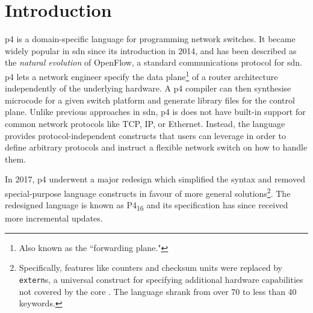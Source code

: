 \chapter*{Introduction}
\setcounter{page}{1}

\newcommand{\pfs}{\texorpdfstring{{P}4\textsubscript{16}}{P4 16} }

\begin{chapterabstract}
\end{chapterabstract}

\acrfull{p4} is a domain-specific language for programming network switches. It
became widely popular in \acrfull{sdn} since its introduction in
2014\cite{p4original}, and has been described as the \emph{natural evolution}
of OpenFlow, a standard communications protocol for \acrshort{sdn}.
\acrshort{p4} lets a network engineer specify the data plane\footnote{Also known
as the ``forwarding plane."} of a router architecture independently of the
underlying hardware. A \acrshort{p4} compiler can then synthesise microcode for
a given switch platform and generate library files for the control plane. Unlike
previous approaches in \acrshort{sdn}, \acrshort{p4} is does not have built-in
support for common network protocols like TCP, IP, or Ethernet. Instead, the
language provides protocol-independent constructs that users can leverage in
order to define arbitrary protocols and instruct a flexible network switch on
how to handle them.

In 2017, \acrshort{p4} underwent a major redesign\cite{p416} which simplified
the syntax and removed special-purpose language constructs in favour of more
general solutions\footnote{Specifically, features like counters and checksum
units were replaced by \texttt{extern}s, a universal construct for specifying
additional hardware capabilities not covered by the core . The language shrank from over 70 to less than 40
keywords.\cite{p416:v1:spec:comparison}}. The redesigned language is known as
\pfs\cite{p416:v123:spec} and its specification has since received more
incremental updates.

